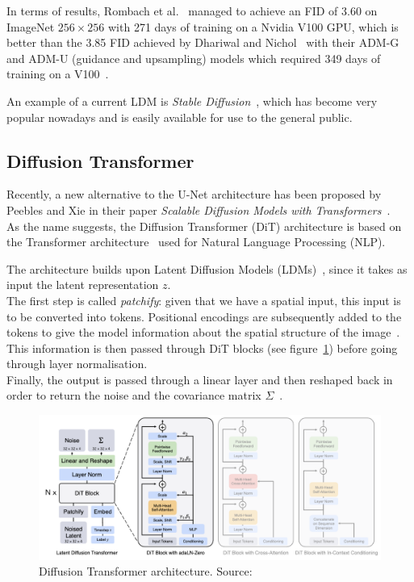 \documentclass{article}
\numberwithin{equation}{section}
\numberwithin{figure}{section}
\begin{document}
In terms of results, Rombach et al.~\cite{rombach2022highresolution} managed to achieve an FID of 3.60 on ImageNet $256 \times 256$ with 271 days of training on a Nvidia V100 GPU, which is better than the 3.85 FID achieved by Dhariwal and Nichol~\cite{dhariwal2021diffusion} with their ADM-G and ADM-U (guidance and upsampling) models which required 349 days of training on a V100~\cite{rombach2022highresolution}.

An example of a current LDM is \textit{Stable Diffusion}~\cite{stablediffusion, rombach2022highresolution}, which has become very popular nowadays and is easily available for use to the general public.

\subsection{Diffusion Transformer}
Recently, a new alternative to the U-Net architecture has been proposed by Peebles and Xie in their paper \textit{Scalable Diffusion Models with Transformers}~\cite{peebles2023scalable}. \\
As the name suggests, the Diffusion Transformer (DiT) architecture is based on the Transformer architecture~\cite{vaswani2023attention} used for Natural Language Processing (NLP).

The architecture builds upon Latent Diffusion Models (LDMs)~\cite{rombach2022highresolution}, since it takes as input the latent representation $z$. \\
The first step is called \textit{patchify}: given that we have a spatial input, this input is to be converted into tokens.
Positional encodings are subsequently added to the tokens to give the model information about the spatial structure of the image~\cite{peebles2023scalable}. \\
This information is then passed through DiT blocks (see figure~\ref{fig:DiT}) before going through layer normalisation. \\
Finally, the output is passed through a linear layer and then reshaped back in order to return the noise and the covariance matrix $\Sigma$~\cite{peebles2023scalable}.
\begin{figure}[h]
  \begin{center}
    \includegraphics[width=\textwidth]{images/DiT.png}
    \caption{Diffusion Transformer architecture. Source:~\cite{peebles2023scalable}}
    \label{fig:DiT}
  \end{center}
\end{figure}
\end{document}
